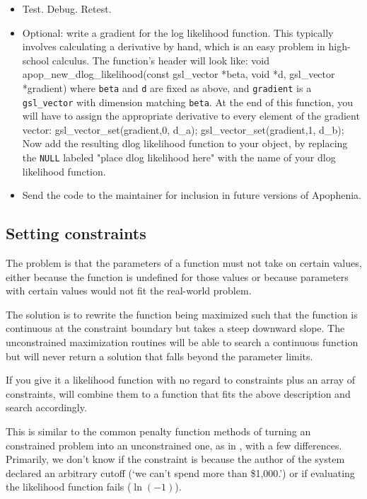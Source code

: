 \begin{itemize}
\item Test. Debug. Retest.

\item Optional: write a gradient for the log likelihood function. This
typically involves calculating a derivative by hand, which is an easy
problem in high-school calculus. The function's header will look like: 
void apop_new_dlog_likelihood(const gsl_vector *beta, void *d, 
                                    gsl_vector *gradient)
where {\tt beta} and {\tt d} are fixed as above, and {\tt gradient} is a {\tt gsl\_\-vector} with dimension matching {\tt beta}. 
At the end of this function, you will have to assign the appropriate derivative to every element of the gradient vector:
gsl_vector_set(gradient,0, d_a);
gsl_vector_set(gradient,1, d_b);
Now add the resulting dlog likelihood function to your object, by replacing the {\tt NULL} labeled "place dlog likelihood here" with the name of your dlog likelihood function.
\item Send the code to the maintainer for inclusion in future versions of Apophenia.
\end{itemize}


\subsection{Setting
constraints}\label{constraintwriting}

The problem is that the parameters of a function must not take on
certain values, either because the function is undefined for those
values or because parameters with certain values would not fit the
real-world problem.

The solution is to rewrite the function being maximized such that the
function is continuous at the constraint boundary but takes a steep
downward slope. The unconstrained maximization routines will be able
to search a continuous function but will never return a solution that
falls beyond the parameter limits.

If you give it a likelihood function with no regard to constraints plus
an array of constraints,  will combine
them to a function that fits the above description and search accordingly.

This is similar to the common penalty function methods of turning an
constrained problem into an unconstrained one, as in \cite{avriel:nonlinear},
with a few differences. Primarily, we don't know if the constraint is
because the author of the system declared an arbitrary cutoff (`we can't spend more
than \$1,000.') or if evaluating the likelihood function fails
($\ln(-1)$). 

